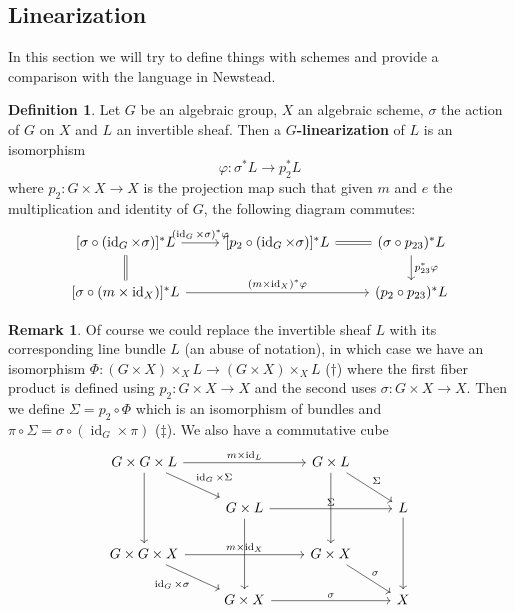 \documentclass[12pt]{article}
\theoremstyle{remark}
\theoremstyle{definition}
\newtheorem{remark}{Remark}[section]
\newtheorem{definition}{Definition}[section]
\newcommand{\s}[0]{\sigma}
\newcommand{\id}[0]{\operatorname{id}}
\begin{document}
    \subsection{Linearization}
    In this section we will try to define things with schemes and provide a comparison with the language in Newstead.
    \begin{definition}
        Let $G$ be an algebraic group, $X$ an algebraic scheme, $\s$ the action of $G$ on $X$ and $L$ an invertible sheaf. Then a \textbf{$G$-linearization} of $L$ is an isomorphism
        \[\varphi:\s^*L\to p_2^*L\]
        where $p_2:G\times X\to X$ is the projection map such that given $m$ and $e$ the multiplication and identity of $G$, the following diagram commutes:
        \[
        \begin{tikzcd}
                {[\sigma\circ(\id_G\times\sigma)]^*L} \arrow[r, "(\id_G\times\sigma)^*\varphi"] \arrow[d,Rightarrow, no head] & {[p_2\circ(\id_G\times\sigma)]^*L} \arrow[r, Rightarrow, no head] & (\sigma\circ p_{23})^*L \arrow[d, "p_{23}^*\varphi"] \\
                {[\s\circ(m\times \id_X)]^*L} \arrow[rr, "(m\times\id_X)^*\varphi"]                                            &                                                                   & (p_2\circ p_{23})^*L                                
        \end{tikzcd}
        \]
    \end{definition}
    \begin{remark}
        Of course we could replace the invertible sheaf $L$ with its corresponding line bundle $L$ (an abuse of notation), in which case we have an isomorphism $\Phi:(G\times X)\times_X  L\to (G\times X)\times_X L$ ($\dagger$) where the first fiber product is defined using $p_2:G\times X\to X$ and the second uses $\s:G\times X\to X$. Then we define $\Sigma=p_2\circ\Phi$ which is an isomorphism of bundles and $\pi\circ\Sigma=\s\circ(\id_G\times\pi)$ ($\ddagger$). We also have a commutative cube
        \[
            \begin{tikzcd}
                G\times G\times L \arrow[rd, "\id_G\times\Sigma"] \arrow[dd] \arrow[rr, "m\times\id_L"] &                                           & G\times L \arrow[rd, "\Sigma"] \arrow[dd] &              \\
                                                                                                        & G\times L \arrow[rr, "\Sigma"] \arrow[dd] &                                           & L \arrow[dd] \\
                G\times G\times X \arrow[rd, "\id_G\times\s"'] \arrow[rr, "m\times\id_X"]               &                                           & G\times X \arrow[rd, "\s"]                &              \\
                                                                                                        & G\times X \arrow[rr, "\s"]                &                                           & X           
                \end{tikzcd}
        \]
    \end{remark}
\end{document}
